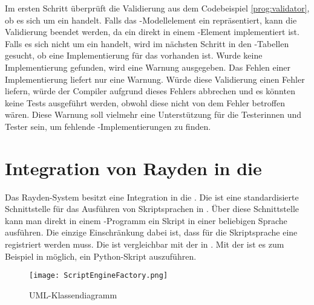 \SuperPar
Im ersten Schritt überprüft die Validierung aus dem Codebeispiel \ref{prog:validator}, ob es sich um ein  handelt. Falls das -Modellelement ein  repräsentiert, kann die Validierung beendet werden, da ein  direkt in einem -Element implementiert ist. Falls es sich nicht um ein  handelt, wird im nächsten Schritt in den -Tabellen gesucht, ob eine Implementierung für das  vorhanden ist. Wurde keine Implementierung gefunden, wird eine Warnung ausgegeben. Das Fehlen einer Implementierung liefert nur eine Warnung. Würde diese Validierung einen Fehler liefern, würde der Compiler aufgrund dieses Fehlers abbrechen und es könnten keine Tests ausgeführt werden, obwohl diese nicht von dem Fehler betroffen wären. Diese Warnung soll vielmehr eine Unterstützung für die Testerinnen und Tester sein, um fehlende -Implementierungen zu finden.


\section{Integration von Rayden in die }
\label{cha:implementJSA}

Das Rayden-System besitzt eine Integration in die . Die  ist eine standardisierte Schnittstelle für das Ausführen von Skriptsprachen in . Über diese Schnittstelle kann man direkt in einem -Programm ein Skript in einer beliebigen Sprache ausführen. Die einzige Einschränkung dabei ist, dass für die Skriptsprache eine  registriert werden muss. Die  ist vergleichbar mit der  \cite{DLR} in . Mit der  ist es zum Beispiel in  möglich, ein Python-Skript \cite{Python} auszuführen.

\begin{figure}
\centering
\texttt{[image: ScriptEngineFactory.png]}
\caption{ UML-Klassendiagramm}
\label{fig:scriptEngineFactoryUml}
\end{figure}

\begin{program}

\caption{Codeauszug aus der }
\label{prog:scriptEngine}
\end{program}

